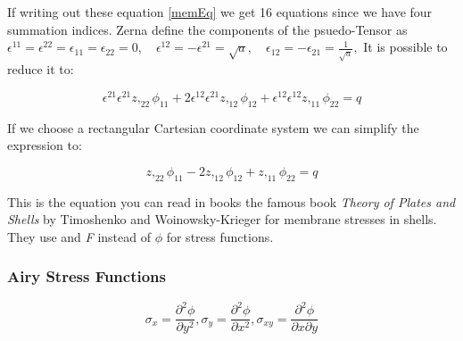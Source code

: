 If writing out these equation \ref{memEq} we get 16 equations since we have four summation indices. Zerna define the components of the  psuedo-Tensor as $\epsilon^{11} = \epsilon^{22}=\epsilon_{11}=\epsilon_{22} = 0,\quad \epsilon^{12} = -\epsilon^{21} = \sqrt{a},\quad \epsilon_{12} = -\epsilon_{21} = \frac{1}{\sqrt{a}},$ It is possible to reduce it to:

\begin{equation}
    \epsilon^{21}\epsilon^{21}z,_{22}\phi_{11} + 2\epsilon^{12}\epsilon^{21}z,_{12}\phi_{12} + \epsilon^{12}\epsilon^{12}z,_{11}\phi_{22} = q
\end{equation}

If we choose a rectangular Cartesian coordinate system we can simplify the expression to:

\begin{equation}
    z,_{22}\phi_{11} -2 z,_{12}\phi_{12} + z,_{11}\phi_{22} = q
\end{equation}

This is the equation you can read in books the famous book \textit{Theory of Plates and Shells} by Timoshenko and Woinowsky-Krieger for membrane stresses in shells. They use and \textit{F} instead of $\phi$ for stress functions.

\subsubsection{Airy Stress Functions}

    
\begin{equation}
\sigma_x = \frac{\partial^2\phi}{\partial y^2}, \sigma_y = \frac{\partial^2\phi}{\partial x^2}, \sigma_{xy} = \frac{\partial^2\phi}{\partial x \partial y}
\end{equation}

